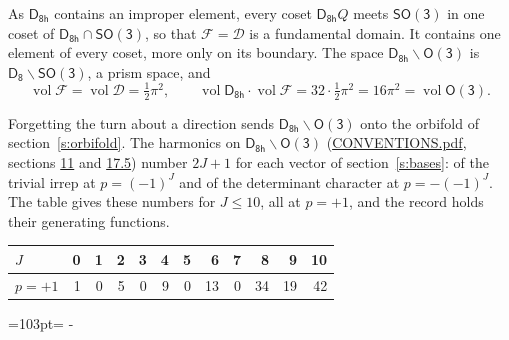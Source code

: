 \documentclass[10pt,a4paper]{article}
\newcommand{\needspace}[1]{\par\penalty-100\begingroup\dimen0=#1\relax\dimen2=\pagegoal
  \advance\dimen2-\pagetotal\ifdim\dimen0>\dimen2\relax\ifdim\dimen2>0pt\vfil\break\fi\fi
  \endgroup}
\numberwithin{equation}{section}
\newcommand{\grp}[1]{\mathsf{#1}}
\newcommand{\vol}{\operatorname{vol}}
\newcommand{\fcell}{\mathcal{D}}
\newcommand{\fdomain}{\mathcal{F}}
\begin{document}
\leavevmode\label{n:set.fundamental}As $\grp{D_{8h}}$ contains an improper element, every coset $\grp{D_{8h}}Q$ meets \href{SO3.pdf}{$\grp{SO(3)}$} in one coset of $\grp{D_{8h}} \cap \grp{SO(3)}$, so that $\fdomain = \fcell$ is a fundamental domain. It contains one element of every coset, more only on its boundary.
The space $\grp{D_{8h}}\backslash\grp{O(3)}$ is $\grp{D_{8}}\backslash\grp{SO(3)}$, a prism space, and
\begin{equation}\label{e:volume}\vol\fdomain = \vol\fcell = \tfrac{1}{2}\pi^2,\qquad \vol\grp{D_{8h}}\cdot\vol\fdomain = 32\cdot \tfrac{1}{2}\pi^2 = 16\pi^2 = \vol\grp{O(3)}.\end{equation}

Forgetting the turn about a direction sends $\grp{D_{8h}}\backslash\grp{O(3)}$ onto the orbifold of section~\ref{s:orbifold}.
The harmonics on $\grp{D_{8h}}\backslash\grp{O(3)}$ (\href{../../CONVENTIONS.pdf}{CONVENTIONS.pdf}, sections \href{../../CONVENTIONS.pdf\#conv.11}{11} and \href{../../CONVENTIONS.pdf\#conv.17.5}{17.5}) number $2J + 1$ for each vector of section~\ref{s:bases}: of the trivial irrep at $p = (-1)^J$ and of the determinant character at $p = -(-1)^J$. The table gives these numbers for $J \le 10$, all at $p = +1$, and the record holds their generating functions.
{\small\setlength{\tabcolsep}{4pt}\begin{longtable}{@{}lrrrrrrrrrrr@{}}\toprule
$J$ & 0 & 1 & 2 & 3 & 4 & 5 & 6 & 7 & 8 & 9 & 10\\\midrule\endhead
\bottomrule\endfoot\endlastfoot
$p = +1$ & 1 & 0 & 5 & 0 & 9 & 0 & 13 & 0 & 34 & 19 & 42\\
\bottomrule\end{longtable}}
\needspace{103pt}
\end{document}
